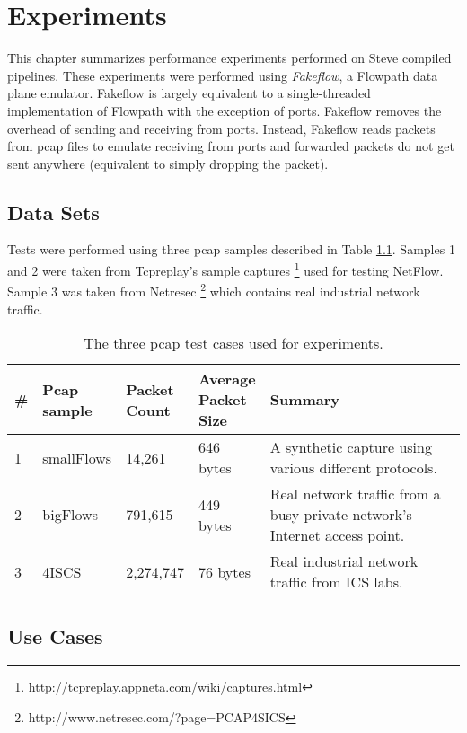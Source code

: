 \chapter{Experiments} \label{ch:experiments}

This chapter summarizes performance experiments performed on Steve compiled pipelines. These experiments were performed using \textit{Fakeflow}, a Flowpath data plane emulator. Fakeflow is largely equivalent to a single-threaded implementation of Flowpath with the exception of ports. Fakeflow removes the overhead of sending and receiving from ports. Instead, Fakeflow reads packets from pcap files to emulate receiving from ports and forwarded packets do not get sent anywhere (equivalent to simply dropping the packet).

\section{Data Sets} \label{exp:use_cases}

Tests were performed using three pcap samples described in Table \ref{tbl:pcap}. Samples 1 and 2 were taken from Tcpreplay's sample captures \footnote{http://tcpreplay.appneta.com/wiki/captures.html} used for testing NetFlow. Sample 3 was taken from Netresec \footnote{http://www.netresec.com/?page=PCAP4SICS} which contains real industrial network traffic.

\begin{table}
\caption{The three pcap test cases used for experiments.}
\begin{center}
\begin{tabular}{| p{0.05\linewidth} || p{0.15\linewidth} | p{0.15\linewidth} | p{0.15\linewidth} | p{0.50\linewidth} |}
\hline
\# & Pcap sample & Packet Count & Average Packet Size & Summary \\
\hline
1 & smallFlows & 14,261 & 646 bytes & A synthetic capture using various different protocols. \\
\hline
2 & bigFlows & 791,615 & 449 bytes & Real network traffic from a busy private network's Internet access point. \\
\hline
3 & 4ISCS & 2,274,747 & 76 bytes & Real industrial network traffic from ICS labs. \\
\hline
\end{tabular}
\end{center}
\label{tbl:pcap}
\end{table}

\section{Use Cases}

